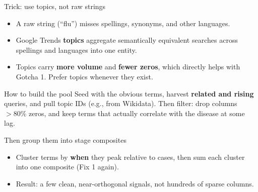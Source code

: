 \documentclass[aspectratio=169,11pt]{beamer}
\begin{document}
\begin{frame}{Trick: use topics, not raw strings}
  \begin{itemize}
    \item A raw string (``flu'') misses spellings, synonyms, and other languages.
    \item Google Trends \textbf{topics} aggregate semantically equivalent searches across
          spellings and languages into one entity.
    \item Topics carry \textbf{more volume} and \textbf{fewer zeros}, which directly helps
          with Gotcha 1. Prefer topics whenever they exist.
  \end{itemize}
  \vspace{0.3em}
  \begin{block}{How to build the pool}
    Seed with the obvious terms, harvest \textbf{related and rising} queries, and pull
    topic IDs (e.g., from Wikidata). Then filter: drop columns $>80\%$ zeros, and keep
    terms that actually correlate with the disease at some lag.
  \end{block}
\end{frame}

\begin{frame}{Then group them into stage composites}
  \begin{center}
  \end{center}
  \begin{itemize}
    \item Cluster terms by \textbf{when} they peak relative to cases, then sum each
          cluster into one composite (Fix 1 again).
    \item Result: a few clean, near-orthogonal signals, not hundreds of sparse columns.
  \end{itemize}
\end{frame}
\end{document}
